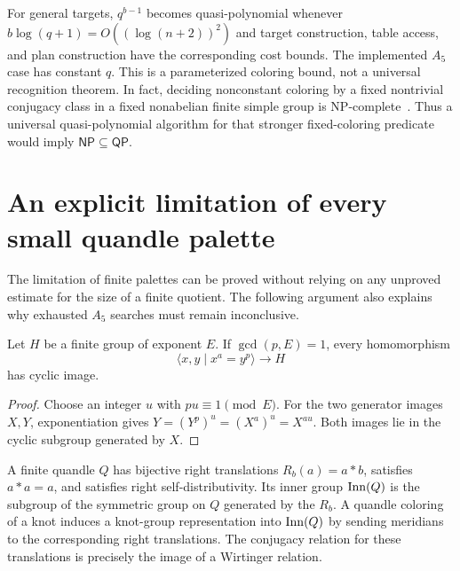 For general targets, $q^{b-1}$ becomes quasi-polynomial whenever
$b\log(q+1)=O((\log(n+2))^2)$ and target construction, table access, and
plan construction have the corresponding cost bounds. The implemented
$A_5$ case has constant $q$. This is a parameterized coloring bound, not
a universal recognition theorem. In fact, deciding nonconstant coloring
by a fixed nontrivial conjugacy class in a fixed nonabelian finite simple
group is NP-complete~\cite{kuperbergsamperton}. Thus a universal
quasi-polynomial algorithm for that stronger fixed-coloring predicate
would imply $\mathsf{NP}\subseteq\mathsf{QP}$.

\section{An explicit limitation of every small quandle palette}
\label{sec:palette}

The limitation of finite palettes can be proved without relying on any
unproved estimate for the size of a finite quotient. The following
argument also explains why exhausted $A_5$ searches must remain
inconclusive.

\begin{lemma}
\label{lem:power}
Let $H$ be a finite group of exponent $E$. If $\gcd(p,E)=1$, every
homomorphism
\[
 \langle x,y\mid x^a=y^p\rangle\longrightarrow H
\]
has cyclic image.
\end{lemma}
\begin{proof}
Choose an integer $u$ with $pu\equiv1\pmod E$. For the two generator
images $X,Y$, exponentiation gives
$Y=(Y^p)^u=(X^a)^u=X^{au}$. Both images lie in the cyclic subgroup
generated by $X$.
\end{proof}

A finite quandle $Q$ has bijective right translations
$R_b(a)=a*b$, satisfies $a*a=a$, and satisfies right
self-distributivity. Its inner group $\operatorname{Inn}(Q)$ is the subgroup of
the symmetric group on $Q$ generated by the $R_b$. A quandle coloring
of a knot induces a knot-group representation into $\operatorname{Inn}(Q)$ by sending
meridians to the corresponding right translations. The conjugacy relation
for these translations is precisely the image of a Wirtinger relation.

